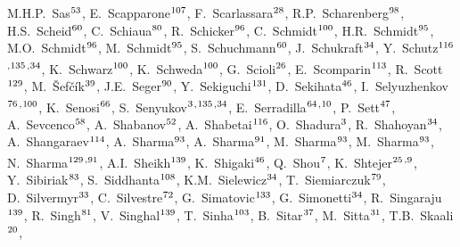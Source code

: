 \begin{flushleft}
M.H.P.~Sas$^\textrm{\scriptsize 53}$,
E.~Scapparone$^\textrm{\scriptsize 107}$,
F.~Scarlassara$^\textrm{\scriptsize 28}$,
R.P.~Scharenberg$^\textrm{\scriptsize 98}$,
H.S.~Scheid$^\textrm{\scriptsize 60}$,
C.~Schiaua$^\textrm{\scriptsize 80}$,
R.~Schicker$^\textrm{\scriptsize 96}$,
C.~Schmidt$^\textrm{\scriptsize 100}$,
H.R.~Schmidt$^\textrm{\scriptsize 95}$,
M.O.~Schmidt$^\textrm{\scriptsize 96}$,
M.~Schmidt$^\textrm{\scriptsize 95}$,
S.~Schuchmann$^\textrm{\scriptsize 60}$,
J.~Schukraft$^\textrm{\scriptsize 34}$,
Y.~Schutz$^\textrm{\scriptsize 116}$\textsuperscript{,}$^\textrm{\scriptsize 135}$\textsuperscript{,}$^\textrm{\scriptsize 34}$,
K.~Schwarz$^\textrm{\scriptsize 100}$,
K.~Schweda$^\textrm{\scriptsize 100}$,
G.~Scioli$^\textrm{\scriptsize 26}$,
E.~Scomparin$^\textrm{\scriptsize 113}$,
R.~Scott$^\textrm{\scriptsize 129}$,
M.~\v{S}ef\v{c}\'ik$^\textrm{\scriptsize 39}$,
J.E.~Seger$^\textrm{\scriptsize 90}$,
Y.~Sekiguchi$^\textrm{\scriptsize 131}$,
D.~Sekihata$^\textrm{\scriptsize 46}$,
I.~Selyuzhenkov$^\textrm{\scriptsize 76}$\textsuperscript{,}$^\textrm{\scriptsize 100}$,
K.~Senosi$^\textrm{\scriptsize 66}$,
S.~Senyukov$^\textrm{\scriptsize 3}$\textsuperscript{,}$^\textrm{\scriptsize 135}$\textsuperscript{,}$^\textrm{\scriptsize 34}$,
E.~Serradilla$^\textrm{\scriptsize 64}$\textsuperscript{,}$^\textrm{\scriptsize 10}$,
P.~Sett$^\textrm{\scriptsize 47}$,
A.~Sevcenco$^\textrm{\scriptsize 58}$,
A.~Shabanov$^\textrm{\scriptsize 52}$,
A.~Shabetai$^\textrm{\scriptsize 116}$,
O.~Shadura$^\textrm{\scriptsize 3}$,
R.~Shahoyan$^\textrm{\scriptsize 34}$,
A.~Shangaraev$^\textrm{\scriptsize 114}$,
A.~Sharma$^\textrm{\scriptsize 93}$,
A.~Sharma$^\textrm{\scriptsize 91}$,
M.~Sharma$^\textrm{\scriptsize 93}$,
M.~Sharma$^\textrm{\scriptsize 93}$,
N.~Sharma$^\textrm{\scriptsize 129}$\textsuperscript{,}$^\textrm{\scriptsize 91}$,
A.I.~Sheikh$^\textrm{\scriptsize 139}$,
K.~Shigaki$^\textrm{\scriptsize 46}$,
Q.~Shou$^\textrm{\scriptsize 7}$,
K.~Shtejer$^\textrm{\scriptsize 25}$\textsuperscript{,}$^\textrm{\scriptsize 9}$,
Y.~Sibiriak$^\textrm{\scriptsize 83}$,
S.~Siddhanta$^\textrm{\scriptsize 108}$,
K.M.~Sielewicz$^\textrm{\scriptsize 34}$,
T.~Siemiarczuk$^\textrm{\scriptsize 79}$,
D.~Silvermyr$^\textrm{\scriptsize 33}$,
C.~Silvestre$^\textrm{\scriptsize 72}$,
G.~Simatovic$^\textrm{\scriptsize 133}$,
G.~Simonetti$^\textrm{\scriptsize 34}$,
R.~Singaraju$^\textrm{\scriptsize 139}$,
R.~Singh$^\textrm{\scriptsize 81}$,
V.~Singhal$^\textrm{\scriptsize 139}$,
T.~Sinha$^\textrm{\scriptsize 103}$,
B.~Sitar$^\textrm{\scriptsize 37}$,
M.~Sitta$^\textrm{\scriptsize 31}$,
T.B.~Skaali$^\textrm{\scriptsize 20}$,

\end{flushleft}
